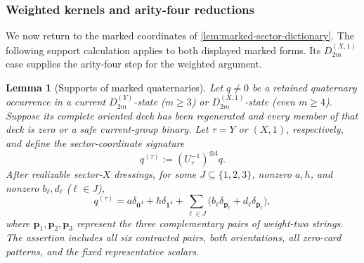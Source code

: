 \documentclass[11pt,letterpaper,onecolumn]{article}
\theoremstyle{plain}
\newtheorem{lemma}[lemma]{Lemma}
\theoremstyle{definition}
\theoremstyle{remark}
\newcommand{\DihY}[1]{{D_{#1}^{(Y)}}}
\newcommand{\DihXone}[1]{{D_{#1}^{(X,1)}}}
\newcommand{\one}{\mathbf 1}
\newcommand{\zero}{\mathbf 0}
\begin{document}
\subsubsection{Weighted kernels and arity-four reductions}

We now return to the marked coordinates of
\cref{lem:marked-sector-dictionary}. The following support calculation
applies to both displayed marked forms. Its \(\DihXone{2m}\) case
supplies the arity-four step for the weighted argument.

\begin{lemma}[Supports of marked quaternaries]
\label{lem:marked-q4-support-atlas}
Let \(q\ne0\) be a retained quaternary occurrence in a current
\(\DihY{2m}\)-state (\(m\ge3\)) or \(\DihXone{2m}\)-state (even
\(m\ge4\)).  Suppose its complete oriented deck has been
regenerated and every member of that deck is zero or a safe current-group
binary.  Let
\(\tau=Y\) or \((X,1)\), respectively, and define the
sector-coordinate signature
\[
  q^{(\tau)}:=(U_\tau^{-1})^{\otimes4}q.
\]
After realizable sector-\(X\) dressings, for some
\(J\subseteq\{1,2,3\}\), nonzero \(a,h\), and nonzero
\(b_\ell,d_\ell\) (\(\ell\in J\)),
\begin{equation}
 q^{(\tau)}
 =a\delta_{\zero^4}+h\delta_{\one^4}
  +\sum_{\ell\in J}
   \bigl(b_\ell\delta_{{\mathbf p}_\ell}
        +d_\ell\delta_{\overline{\mathbf p}_\ell}\bigr),
 \label{eq:marked-q4-complement-form}
\end{equation}
where \({\mathbf p}_1,{\mathbf p}_2,{\mathbf p}_3\) represent the three complementary pairs of
weight-two strings.  The assertion includes all six contracted pairs, both
orientations, all zero-card patterns, and the fixed representative scalars.
\end{lemma}
\end{document}
